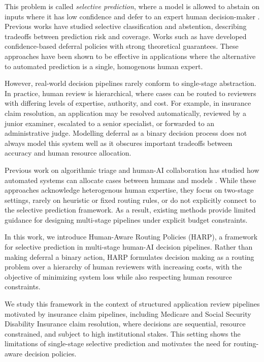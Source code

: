 \documentclass[conference]{IEEEtran}
\begin{document}
This problem is called \textit{selective prediction}, where a model is
allowed to abstain on inputs where it has low confidence and defer to an
expert human decision-maker \cite{elyaniv2010, geifman2017}. Previous works
have studied selective classification and abstention, describing 
tradeoffs between prediction risk and coverage. Works such as \cite{geifman2017,fisch2024}
have developed confidence-based deferral policies with strong theoretical 
guarantees. These approaches have been shown to be effective in applications where the
alternative to automated prediction is a single, homogenous human expert.

However, real-world decision pipelines rarely conform to single-stage abstraction. In practice,
human review is hierarchical, where cases can be routed to reviewers with differing levels
of expertise, authority, and cost. For example, in insurance claim resolution, an application
may be resolved automatically, reviewed by a junior examiner, escalated to a senior specialist,
or forwarded to an administrative judge. Modelling deferral as a binary decision process does
not always model this system well as it obscures important tradeoffs between accuracy and
human resource allocation.

Previous work on algorithmic triage and human-AI collaboration has studied how automated systems
can allocate cases between humans and models \cite{raghu2019,mozannar2021,wilder2020}. While these
approaches acknowledge heterogenous human expertise, they focus on two-stage settings, rarely
on heuristic or fixed routing rules, or do not explicitly connect to the selective prediction
framework. As a result, existing methods provide limited guidance for designing multi-stage
pipelines under explicit budget constraints.

In this work, we introduce Human-Aware Routing Policies (HARP), a framework for selective
prediction in multi-stage human-AI decision pipelines. Rather than making deferral a binary
action, HARP formulates decision making as a routing problem over a hierarchy of human reviewers
with increasing costs, with the objective of minimizing system loss while also respecting
human resource constraints. 

We study this framework in the context of structured application review pipelines motivated by 
insurance claim pipelines, including Medicare and Social Security Disability Insurance claim resolution, where decisions are sequential,
resource constrained, and subject to high institutional stakes. This setting shows the limitations
of single-stage selective prediction and motivates the need for routing-aware decision policies.
\end{document}
